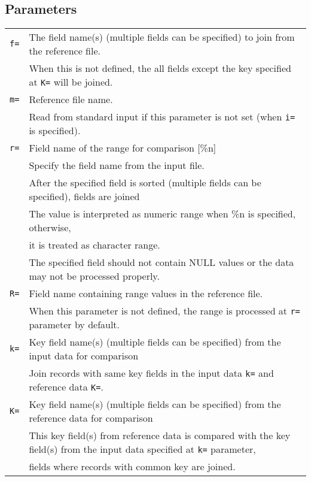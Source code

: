 \subsection*{Parameters}
\begin{table}[htbp]
{\small
\begin{tabular}{ll}
\verb|f=|    & The field name(s) (multiple fields can be specified) to join from the reference file.\\
             & When this is not defined, the all fields except the key specified at \verb|K=| will be joined.\\
\verb|m=|    & Reference file name.\\
             & Read from standard input if this parameter is not set (when \verb|i=| is specified). \\
\verb|r=|    & Field name of the range for comparison [\%n] \\
             & Specify the field name from the input file.\\
             & After the specified field is sorted (multiple fields can be specified), fields are joined \\
             & The value is interpreted as numeric range when \%n is specified, otherwise, \\
             & it is treated as character  range. \\
             & The specified field should not contain NULL values or the data may not be processed properly. \\
\verb|R=|    & Field name containing range values in the reference file. \\
             & When this parameter is not defined, the range is processed at \verb|r=| parameter by default.\\
\verb|k=|    & Key field name(s) (multiple fields can be specified) from the input data for comparison \\
	             & Join records with same key fields in the input data \verb|k=| and reference data \verb|K=|.\\
\verb|K=|    & Key field name(s) (multiple fields can be specified) from the reference data for comparison \\
             & This key field(s) from reference data is compared with the key field(s) from the input data specified at \verb|k=| parameter, \\
             &  fields where records with common key are joined.\\

\end{tabular}}
\end{table}
